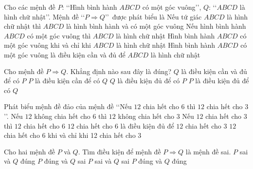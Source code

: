 \begin{ex}%
	 Cho các mệnh đề $P$: \lq\lq Hình bình hành $ABCD$ có một góc vuông\rq\rq , $Q$: \lq\lq $ABCD$ là hình chữ nhật\rq\rq. Mệnh đề \lq\lq $P \Rightarrow Q$\rq\rq\, được phát biểu là
	 \choice
		 {Nếu tứ giác $ABCD$ là hình chữ nhật thì $ABCD$ là hình bình hành và có một góc vuông}
		{\True Nếu  hình bình hành $ABCD$ có một góc vuông thì $ABCD$ là hình chữ nhật}
		 {Hình bình hành $ABCD$ có một góc vuông khi và chỉ khi $ABCD$ là hình chữ nhật}
		{Hình bình hành $ABCD$ có một góc vuông là điều kiện cần và đủ để $ABCD$  là hình chữ nhật}
\end{ex}

\begin{ex}%
	Cho mệnh đề $P \Rightarrow Q$. Khẳng định nào sau đây là  đúng?
	\choice 
		{$Q$ là điều kiện  cần và đủ để có $P$}
		{$P$ là điều kiện cần để  có $Q$}
		{$Q$ là điều kiện đủ  để có $P$}
		{\True $P$ là điều kiện đủ  để có $Q$}
\end{ex}

\begin{ex}%
	Phát biểu mệnh đề đảo của  mệnh đề \lq\lq Nếu $12$ chia hết cho $6$ thì $12$ chia hết cho $3$\rq\rq .
	\choice 
		{Nếu $12$  không chia hết cho $6$ thì $12$ không chia hết cho $3$}
		{\True  Nếu $12$ chia hết cho $3$ thì $12$ chia hết cho $6$}
		{$12$ chia hết cho  $6$ là điều kiện đủ để $12$ chia hết cho $3$}
		{$12$ chia hết cho $6$ khi và chỉ khi 12 chia  hết cho $3$}
\end{ex}

\begin{ex}%
	Cho hai mệnh đề $P$ và  $Q$. Tìm điều kiện để mệnh đề $P \Rightarrow Q$ là mệnh đề sai.
	 \choice
		{$P$  sai và $Q$ đúng}
		{\True $P$ đúng và  $Q$ sai}
		{$P$ sai và $Q$ sai} 
		{$P$  đúng và $Q$ đúng}
\end{ex}

